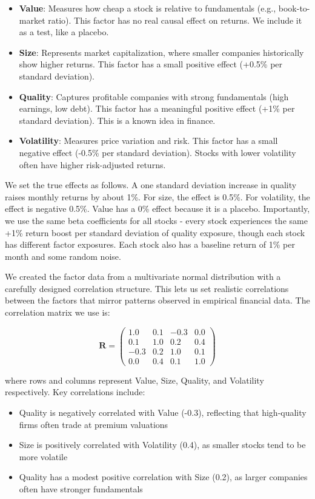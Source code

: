 \begin{itemize}
    \item \textbf{Value}: Measures how cheap a stock is relative to fundamentals (e.g., book-to-market ratio). This factor has no real causal effect on returns. We include it as a test, like a placebo.
    \item \textbf{Size}: Represents market capitalization, where smaller companies historically show higher returns. This factor has a small positive effect (+0.5\% per standard deviation).
    \item \textbf{Quality}: Captures profitable companies with strong fundamentals (high earnings, low debt). This factor has a meaningful positive effect (+1\% per standard deviation). This is a known idea in finance.
    \item \textbf{Volatility}: Measures price variation and risk. This factor has a small negative effect (-0.5\% per standard deviation). Stocks with lower volatility often have higher risk-adjusted returns.
\end{itemize}
We set the true effects as follows. A one standard deviation increase in quality raises monthly returns by about 1\%. For size, the effect is 0.5\%. For volatility, the effect is negative 0.5\%. Value has a 0\% effect because it is a placebo. Importantly, we use the same beta coefficients for all stocks - every stock experiences the same +1\% return boost per standard deviation of quality exposure, though each stock has different factor exposures. Each stock also has a baseline return of 1\% per month and some random noise.

We created the factor data from a multivariate normal distribution with a carefully designed correlation structure. This lets us set realistic correlations between the factors that mirror patterns observed in empirical financial data. The correlation matrix we use is:

\begin{equation}
\mathbf{R} = \begin{pmatrix}
1.0 & 0.1 & -0.3 & 0.0 \\
0.1 & 1.0 & 0.2 & 0.4 \\
-0.3 & 0.2 & 1.0 & 0.1 \\
0.0 & 0.4 & 0.1 & 1.0
\end{pmatrix}
\end{equation}

where rows and columns represent Value, Size, Quality, and Volatility respectively. Key correlations include:
\begin{itemize}
    \item Quality is negatively correlated with Value (-0.3), reflecting that high-quality firms often trade at premium valuations
    \item Size is positively correlated with Volatility (0.4), as smaller stocks tend to be more volatile
    \item Quality has a modest positive correlation with Size (0.2), as larger companies often have stronger fundamentals
\end{itemize}

